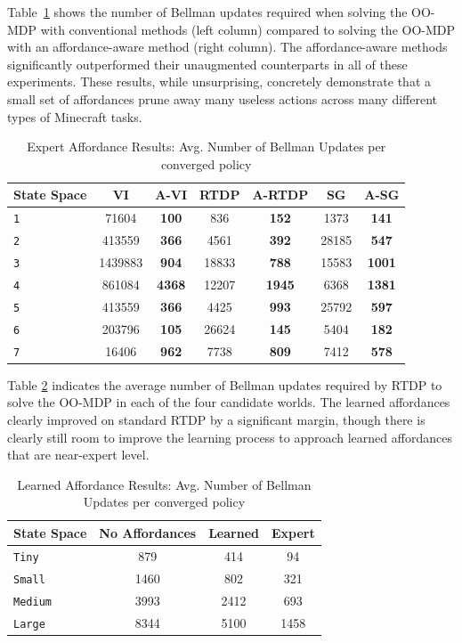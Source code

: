 \documentclass[conference]{IEEEtran}
\begin{document}
Table~\ref{table:hard-results} shows the number of Bellman updates required when solving the OO-MDP with conventional methods (left column)
compared to solving the OO-MDP with an affordance-aware method (right column).  The
affordance-aware methods significantly outperformed their unaugmented
counterparts in all of these experiments. These
results, while unsurprising, concretely demonstrate that a small set of affordances prune away many useless actions across many different types of Minecraft tasks. 

\begin{table}
\centering
\caption{Expert Affordance Results: Avg. Number of Bellman Updates per converged policy}
\begin{tabular}{ l || c c | c c | c  c }
  State Space& VI & A-VI & RTDP & A-RTDP & SG & A-SG \\ \hline
  \texttt{1} 		&	71604 		& 	{\bf 100} 		& 	836 		& 	{\bf 152} 		&	1373 	& 	{\bf 141}  			\\ %
  \texttt{2} 		&	413559 	 	& 	{\bf 366}  		& 	4561 	& 	{\bf 392} 		&	28185 	& 	{\bf 547}  \\ %
  \texttt{3} 		&	1439883 		& 	{\bf 904}		& 	18833	& 	{\bf 788}		&	15583	& 	{\bf 1001} 			\\ %
  \texttt{4} 		&	861084 	 	& 	{\bf 4368}		& 	12207	& 	{\bf 1945}		&	6368		& 	{\bf 1381}	\\ %
  \texttt{5}  		&	413559 		& 	{\bf 366}	 	& 	4425 	& 	{\bf 993}  		&	25792	& 	{\bf 597}   \\ %
  \texttt{6}  		&	203796 		& 	{\bf 105}		& 	26624	& 	{\bf 145}  		&	5404 	& 	{\bf 182}	\\ %
  \texttt{7}  		&	16406		& 	{\bf 962}		& 	7738 	& 	{\bf 809}  		&	7412 	& 	{\bf 578} %
\end{tabular}
\label{table:hard-results}
\end{table}

Table \ref{table:learned-results} indicates the average number of Bellman updates required by RTDP to solve the OO-MDP
in each of the four candidate worlds. The learned affordances clearly improved on standard RTDP by a significant margin, though
there is clearly still room to improve the learning process to approach learned affordances that are near-expert level.
\begin{table}
\centering
\caption{Learned Affordance Results: Avg. Number of Bellman Updates per converged policy}
\begin{tabular}{ l || c c c }
  State Space & No Affordances & Learned & Expert  \\ \hline
  \texttt{Tiny}  		& 	879		&	414	&	 94	\\
  \texttt{Small}  	& 	1460		&	802	&	321  \\
  \texttt{Medium}  	& 	3993		&	2412	&	693  \\
  \texttt{Large}  	& 	8344		&	5100	&	1458
\end{tabular}
\label{table:learned-results}
\end{table}
\end{document}
